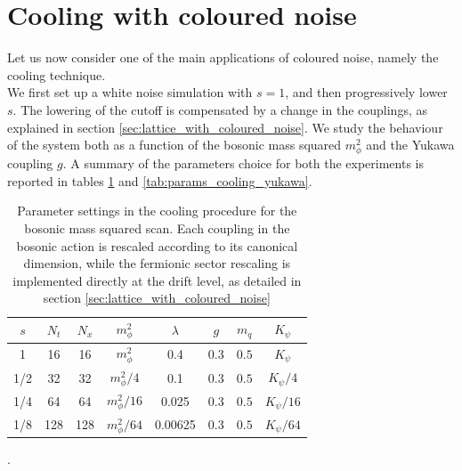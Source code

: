 \section{Cooling with coloured noise}
Let us now consider one of the main applications of coloured noise, namely the cooling technique. \\
We first set up a white noise simulation with $s=1$, and then progressively lower $s$. The lowering of the cutoff is compensated by a change in the couplings, as explained in section \ref{sec:lattice_with_coloured_noise}. 
We study the behaviour of the system both as a function of the bosonic mass squared $m_\phi^2$ and the Yukawa coupling $g$. 
A summary of the parameters choice for both the experiments is reported in tables \ref{tab:params_cooling} and \ref{tab:params_cooling_yukawa}.
\begin{table}[htp]
    \centering
    \begin{tabular}{cccccccc}
        \toprule
        $s$ & $N_t$ & $N_x$ & $m_\phi^2$ & $\lambda$ & $g$ & $m_q$& $K_\psi$ \\
        \midrule 
        1 & 16 & 16 & $m_\phi^2$ & 0.4 & 0.3 & $0.5$ & $K_\psi$ \\
        1/2 & 32 & 32 & $m_\phi^2/4$ & 0.1 & 0.3 & $0.5$ & $K_\psi/4$ \\
        1/4 & 64 & 64 & $m_\phi^2/16$ & 0.025 & 0.3 & $0.5$ & $K_\psi/16$ \\
        1/8 & 128 & 128 & $m_\phi^2/64$ & 0.00625 & 0.3 & $0.5$ & $K_\psi/64$ \\
        \bottomrule
    \end{tabular}
    \caption[Parameter settings in the cooling procedure for the Bosonic mass squared scan]{Parameter settings in the cooling procedure for the bosonic mass squared scan. Each coupling in the bosonic action is rescaled according to its canonical dimension, while the fermionic sector rescaling is implemented directly at the drift level, as detailed in section \ref{sec:lattice_with_coloured_noise}}.
    \label{tab:params_cooling}
\end{table}
